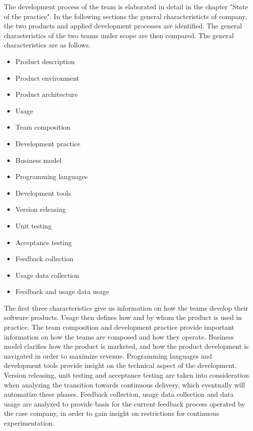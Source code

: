 \documentclass[english]{tktltiki2}
\theoremstyle{definition}
\theoremstyle{remark}
\begin{document}

The development process of the team is elaborated in detail in the chapter "State of the practice". In the following sections the general characteristicts of company, the two products and applied development processes are identified. The general charasteristics of the two teams under scope are then compared. The general characteristics are as follows. 

\begin{multicols}{2}
\begin{itemize}
  \item Product description
  \item Product environment
  \item Product architecture
  \item Usage
  \item Team composition
  \item Development practice
  \item Business model
  \item Programming languages
  \item Development tools
  \item Version releasing
  \item Unit testing
  \item Acceptance testing
  \item Feedback collection
  \item Usage data collection
  \item Feedback and usage data usage
\end{itemize}
\end{multicols}

The first three characteristics give us information on how the teams develop their software products. Usage then defines how and by whom the product is used in practice. The team composition and development practice provide important information on how the teams are composed and how they operate. Business model clarifies how the product is marketed, and how the product development is navigated in order to maximize revenue. Programming languages and development tools provide insight on the technical aspect of the development. Version releasing, unit testing and acceptance testing are taken into consideration when analyzing the transition towards continuous delivery, which eventually will automatize these phases. Feedback collection, usage data collection and data usage are analyzed to provide basis for the current feedback process operated by the case company, in order to gain insight on restrictions for continuous experimentation. 
\end{document}
